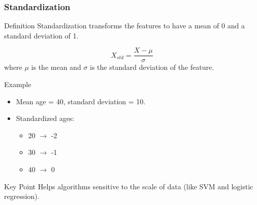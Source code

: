 \documentclass[aspectratio=169]{beamer}
\begin{document}
\begin{frame}[fragile]
    \frametitle{Standardization}
    \begin{block}{Definition}
        Standardization transforms the features to have a mean of 0 and a standard deviation of 1.
    \end{block}
    \begin{equation}
        X_{std} = \frac{X - \mu}{\sigma}
    \end{equation}
    where \( \mu \) is the mean and \( \sigma \) is the standard deviation of the feature.

    \begin{block}{Example}
        \begin{itemize}
            \item Mean age = 40, standard deviation = 10.
            \item Standardized ages:
            \begin{itemize}
                \item 20 $\rightarrow$ -2
                \item 30 $\rightarrow$ -1
                \item 40 $\rightarrow$ 0
            \end{itemize} 
        \end{itemize}
    \end{block}
    \begin{block}{Key Point}
        Helps algorithms sensitive to the scale of data (like SVM and logistic regression).
    \end{block}
\end{frame}
\end{document}
